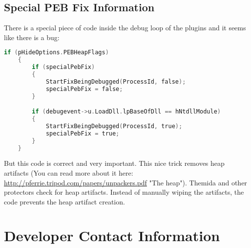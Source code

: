 \documentclass[10pt,a4paper]{article}
\begin{document}
\subsection{Special PEB Fix Information}

There is a special piece of code inside the debug loop of the plugins and it seems like there is a bug:
\begin{lstlisting}[language=C, caption=Special PEB Fix Code]
    if (pHideOptions.PEBHeapFlags)
    {
        if (specialPebFix)
        {
            StartFixBeingDebugged(ProcessId, false);
            specialPebFix = false;
        }

        if (debugevent->u.LoadDll.lpBaseOfDll == hNtdllModule)
        {
            StartFixBeingDebugged(ProcessId, true);
            specialPebFix = true;
        }
    }
\end{lstlisting}
But this code is correct and very important. This nice trick removes heap artifacts (You can read more about it here: \url{http://pferrie.tripod.com/papers/unpackers.pdf} "The heap"). Themida and other protectors check for heap artifacts. Instead of manually wiping the artifacts, the code prevents the heap artifact creation.

\section{Developer Contact Information}
\end{document}
